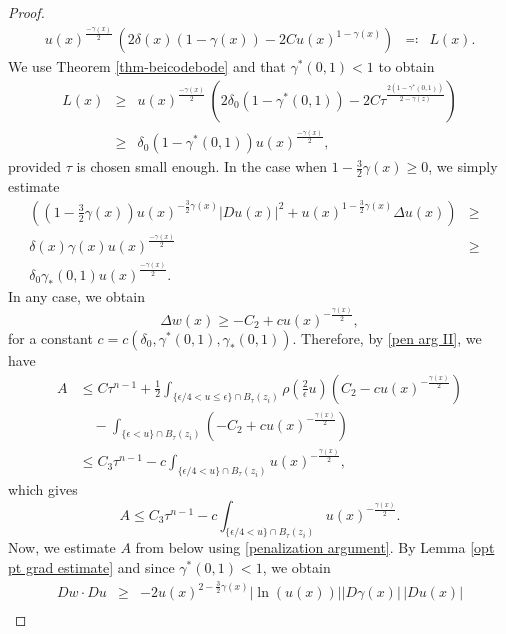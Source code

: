 \documentclass[reqno,11pt]{amsart}
\newcommand{\1}{\mathds{1}}
\numberwithin{equation}{section}
\begin{document}
\begin{proof}
\begin{eqnarray*}
     \displaystyle u(x)^{\frac{-\gamma(x)}{2}}\,\left(2\delta(x)(1-\gamma(x))  - 2Cu(x)^{1-\gamma(x)}  \right) & \eqqcolon & L(x). 
\end{eqnarray*}
We use Theorem \ref{thm-beicodebode} and that $\gamma^\ast(0,1) < 1$ to obtain
\begin{eqnarray*}
	L(x) & \geq & u(x)^{\frac{-\gamma(x)}{2}}\,\left(2\delta_0 \left(1-\gamma^\ast(0,1)\right) - 2C\tau^{\frac{2\left(1-\gamma^\ast(0,1)\right)}{2-\gamma(z)}} \right)\\
	  & \geq & \delta_0 \left(1-\gamma^\ast(0,1)\right) u(x)^{\frac{-\gamma(x)}{2}}, 
\end{eqnarray*}
provided $\tau$ is chosen small enough. In the case when $1-\frac{3}{2}\gamma(x) \geq 0$, we simply estimate
\begin{eqnarray*}
    \displaystyle \left(\left(1-\frac{3}{2}\gamma(x)\right)u(x)^{-\frac{3}{2}\gamma(x)}|Du(x)|^2 + u(x)^{1-\frac{3}{2}\gamma(x)}\Delta u(x) \right) & \geq &   \\ 
     \displaystyle \delta(x) \gamma(x) u(x)^{\frac{-\gamma(x)}{2}}& \geq &\\
     \displaystyle \delta_0 \gamma_\ast(0,1) u(x)^{\frac{-\gamma(x)}{2}}. & & 
\end{eqnarray*}
In any case, we obtain
$$
    \Delta w(x) \geq -C_2 + c u(x)^{-\frac{\gamma(x)}{2}},
$$
for a constant $c = c(\delta_0,\gamma^\ast(0,1),\gamma_\ast(0,1))$. Therefore, by \eqref{pen arg II}, we have
\begin{align*}
        A & \leq  \displaystyle C\tau^{n-1} +  \frac{1}{2}\int_{\{ \epsilon/4 < u \leq \epsilon\}\cap B_\tau(z_i)} \rho\left(\frac{2}{\epsilon} u\right) \left(C_2 - c u(x)^{-\frac{\gamma(x)}{2}}\right)\\
        &  \quad -\displaystyle  \int_{\{ \epsilon < u \}\cap B_\tau(z_i)} \left(-C_2 + cu(x)^{-\frac{\gamma(x)}{2}}\right)\\
        & \leq  \displaystyle C_3 \tau^{n-1} - c\int_{\{ \epsilon/4 < u \}\cap B_\tau(z_i)} u(x)^{-\frac{\gamma(x)}{2}},
\end{align*}
which gives
\begin{equation}\label{consequence eq above}
    A \leq C_3 \tau^{n-1} - c\int_{\{ \epsilon/4 < u \}\cap B_\tau(z_i)} u(x)^{-\frac{\gamma(x)}{2}}.
\end{equation}
Now, we estimate $A$ from below using \eqref{penalization argument}. By Lemma \ref{opt pt grad estimate} and since $\gamma^\ast(0,1) < 1$, we obtain
\begin{eqnarray*}
       Dw \cdot Du  & \geq & - 2u(x)^{2-\frac{3}{2}\gamma(x)} |\ln(u(x))| |D\gamma(x)|\,|Du(x)|\\

\end{eqnarray*}
\end{proof}
\end{document}
